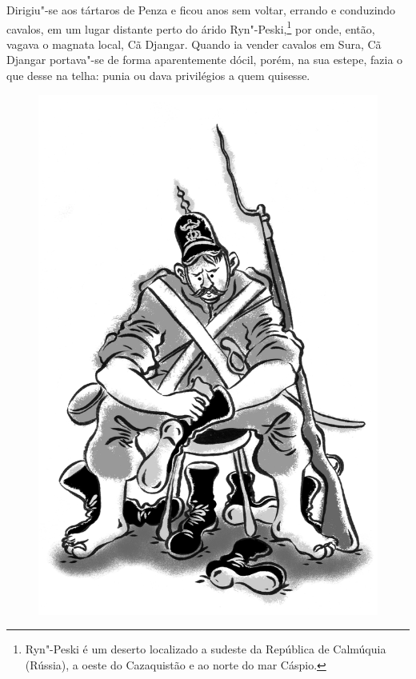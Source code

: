 Dirigiu"-se aos tártaros de Penza e ficou anos sem voltar, errando e
conduzindo cavalos, em um lugar distante perto do árido
Ryn"-Peski,\footnote{Ryn"-Peski é um deserto localizado a sudeste da
  República de Calmúquia (Rússia), a oeste do Cazaquistão e ao norte do
  mar Cáspio.} por onde, então, vagava o magnata local, Cã Djangar.
Quando ia vender cavalos em Sura, Cã Djangar portava"-se de forma
aparentemente dócil, porém, na sua estepe, fazia o que desse na telha:
punia ou dava privilégios a quem quisesse.

\begin{figure}%
\vspace*{-2cm}
\hspace*{-2cm}\includegraphics[width=140mm]{./imgs/cena5.jpg}
\end{figure}

